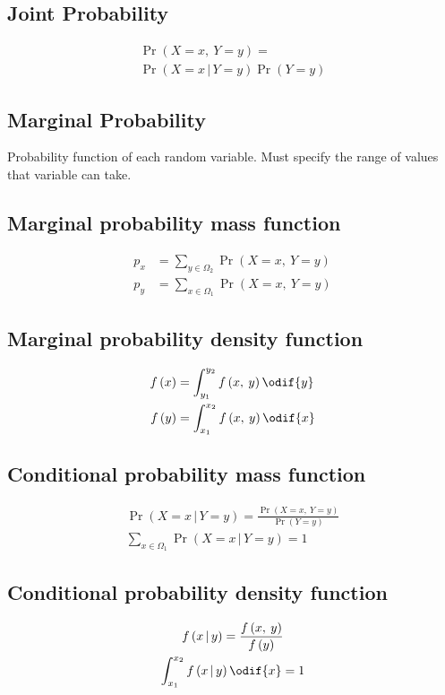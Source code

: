 \documentclass{article}
\begin{document}
\begin{multicols}{3}
    \subsection{Joint Probability}
    \begin{multline*}
        \Pr{\left( X = x ,\: Y = y \right)} =                               \\
        \Pr{\left( X = x \,\vert\, Y = y \right)} \Pr{\left( Y = y \right)}
    \end{multline*}
    \subsection{Marginal Probability}
    Probability function of each random variable.
    Must specify the range of values that variable can take.
    \subsection{Marginal probability mass function}
    \begin{align*}
        p_x & = \sum_{y \in \Omega_2} \Pr{\left( X = x,\: Y = y \right)} \\
        p_y & = \sum_{x \in \Omega_1} \Pr{\left( X = x,\: Y = y \right)}
    \end{align*}
    \subsection{Marginal probability density function}
    \begin{align*}
        f\left( x \right) & = \int_{y_1}^{y_2} f\left( x,\: y \right) \odif{y} \\
        f\left( y \right) & = \int_{x_1}^{x_2} f\left( x,\: y \right) \odif{x}
    \end{align*}
    \subsection{Conditional probability mass function}
    \begin{gather*}
        \Pr{\left( X = x \,\vert\, Y = y \right)} = \frac{\Pr{\left( X = x,\: Y = y \right)}}{\Pr{\left( Y = y \right)}} \\
        \sum_{x \in \Omega_1} \Pr{\left( X = x \,\vert\, Y = y \right)} = 1
    \end{gather*}
    \subsection{Conditional probability density function}
    \begin{gather*}
        f\left( x \,\vert\, y \right) = \frac{f\left( x,\: y \right)}{f\left( y \right)} \\
        \int_{x_1}^{x_2} f\left( x \,\vert\, y \right) \odif{x} = 1
    \end{gather*}

\end{multicols}
\end{document}
